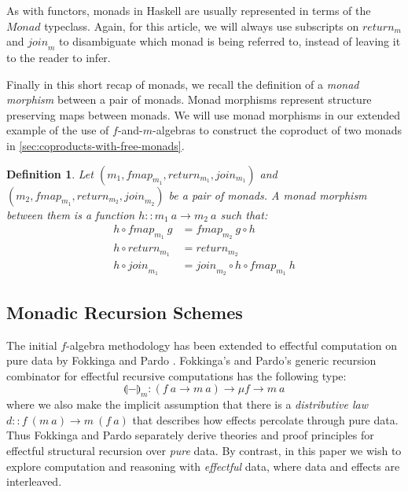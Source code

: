 \documentclass{jfp1}
\newcommand{\fold}[1]{\llparenthesis #1 \rrparenthesis}
\newtheorem{definition}{Definition}
\begin{document}
As with functors, monads in Haskell are usually represented in terms of
the $\textit{Monad}$ typeclass. Again, for this article, we will
always use subscripts on $\mathit{return}_m$ and $\mathit{join}_m$ to
disambiguate which monad is being referred to, instead of leaving it
to the reader to infer.

Finally in this short recap of monads, we recall the definition of a
\emph{monad morphism} between a pair of monads. Monad morphisms
represent structure preserving maps between monads. We will use monad
morphisms in our extended example of the use of $f$-and-$m$-algebras
to construct the coproduct of two monads in
\autoref{sec:coproducts-with-free-monads}.

\begin{definition}
  Let $(m_1, \mathit{fmap_{m_1}}, \mathit{return}_{m_1},
  \mathit{join_{m_1}})$ and $(m_2, \mathit{fmap_{m_1}},
  \mathit{return}_{m_2}, \mathit{join}_{m_2})$ be a pair of monads. A
  \emph{monad morphism} between them is a function $h :: m_1~a \to
  m_2~a$ such that:
  \begin{align}
    \label{eq:monad-mor-natural}
    h \circ \mathit{fmap}_{m_1}~g & = \mathit{fmap}_{m_2}~g \circ h \\
    \label{eq:monad-mor-return}
    h \circ \mathit{return}_{m_1} & = \mathit{return}_{m_2} \\
    \label{eq:monad-mor-join}
    h \circ \mathit{join}_{m_1} & = \mathit{join}_{m_2} \circ h \circ \mathit{fmap}_{m_1}~h
  \end{align}
\end{definition}

\subsection{Monadic Recursion Schemes}

The initial $f$-algebra methodology has been extended to effectful
computation on pure data by Fokkinga \cite{fokkinga94monadic} and
Pardo \cite{pardo04combining}. Fokkinga's and Pardo's generic recursion
combinator for effectful recursive computations has the following
type:
\begin{displaymath}
  \fold{-}_m : (f~a \to m~a) \to \mu f \to m~a
\end{displaymath}
where we also make the implicit assumption that there is a
\emph{distributive law} $d :: f~(m~a) \to m~(f~a)$ that describes how
effects percolate through pure data. Thus Fokkinga and Pardo
separately derive theories and proof principles for effectful
structural recursion over \emph{pure} data. By contrast, in this paper
we wish to explore computation and reasoning with \emph{effectful}
data, where data and effects are interleaved.
\end{document}
